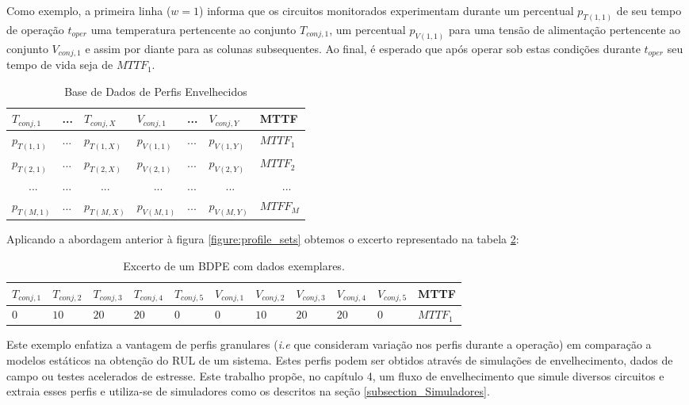 Como exemplo, a primeira linha ($w=1$) informa que os circuitos monitorados experimentam durante um percentual $p_{T(1,1)}$ de seu tempo de operação $t_{oper}$ uma temperatura pertencente ao conjunto $T_{conj,1}$, um percentual $p_{V(1,1)}$ para uma tensão de alimentação pertencente ao conjunto $V_{conj,1}$ e assim por diante para as colunas subsequentes. Ao final, é esperado que após operar sob estas condições durante $t_{oper}$ seu tempo de vida seja de $MTTF_1$.

\begin{table}[H]
\centering
\caption{Base de Dados de Perfis Envelhecidos}
\begin{tabular}{@{}l|l|l|l|l|l|l@{}}
\toprule
$T_{conj,1}$ & {...} & $T_{conj,X}$ & $V_{conj,1}$ & {...} & $V_{conj,Y}$ & MTTF \\ \midrule
$p_{T(1,1)}$ & {...} & $p_{T(1,X)}$ & $p_{V(1,1)}$ & {...} & $p_{V(1,Y)}$ & $MTTF_1$ \\
$p_{T(2,1)}$ & {...} & $p_{T(2,X)}$ & $p_{V(2,1)}$ & {...} & $p_{V(2,Y)}$ & $MTTF_2$ \\
\ \ \ {...} & {...} & \ \ \ {...} & \ \ \ {...} & {...} & \ \ \ {...} & \ \ \ \ {...} \\
$p_{T(M,1)}$ & {...} & $p_{T(M,X)}$ & $p_{V(M,1)}$ & {...} & $p_{V(M,Y)}$ & $MTFF_M$ \\ \bottomrule
\end{tabular}

\label{tb:BDPE}
\end{table}
Aplicando a abordagem anterior à figura \ref{figure:profile_sets} obtemos o excerto representado na tabela \ref{tb:BDPE_reduzida}:
\begin{table}[H]
\centering
\caption{Excerto de um BDPE com dados exemplares.}
\begin{tabular}{@{}l|l|l|l|l|l|l|l|l|l|l@{}}
\toprule
$T_{conj,1}$ & $T_{conj,2}$ & $T_{conj,3}$ & $T_{conj,4}$ & $T_{conj,5}$ & $V_{conj,1}$ & $V_{conj,2}$ & $V_{conj,3}$ & $V_{conj,4}$ & $V_{conj,5}$ & MTTF \\ \midrule
$0$ & $10$ & $20$ & $20$ & $0$ & $0$ & $10$ & $20$ & $20$ & $0$  & $MTTF_1$ \\
\bottomrule
\end{tabular}

\label{tb:BDPE_reduzida}
\end{table}
Este exemplo enfatiza a vantagem de perfis granulares (\textit{i.e} que consideram variação nos perfis durante a operação) em comparação a modelos estáticos na obtenção do RUL de um sistema. Estes perfis podem ser obtidos através de simulações de envelhecimento, dados de campo ou testes acelerados de estresse. Este trabalho propõe, no capítulo 4, um fluxo de envelhecimento que simule diversos circuitos e extraia esses perfis e utiliza-se de simuladores como os descritos na seção \ref{subsection_Simuladores}.

